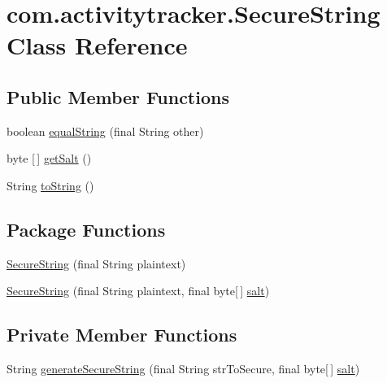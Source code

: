 \hypertarget{classcom_1_1activitytracker_1_1_secure_string}{}\section{com.\+activitytracker.\+Secure\+String Class Reference}
\label{classcom_1_1activitytracker_1_1_secure_string}
\subsection*{Public Member Functions}
\begin{DoxyCompactItemize}
\item 
boolean \mbox{\hyperlink{classcom_1_1activitytracker_1_1_secure_string_a8b5c3cac74b22ff0eb3c43a7ebd980f5}{equal\+String}} (final String other)
\item 
byte \mbox{[}$\,$\mbox{]} \mbox{\hyperlink{classcom_1_1activitytracker_1_1_secure_string_ab5369653852da122aba874f35cbda9a5}{get\+Salt}} ()
\item 
String \mbox{\hyperlink{classcom_1_1activitytracker_1_1_secure_string_aef531e12618c5c147adc52fda0d4add8}{to\+String}} ()
\end{DoxyCompactItemize}
\subsection*{Package Functions}
\begin{DoxyCompactItemize}
\item 
\mbox{\hyperlink{classcom_1_1activitytracker_1_1_secure_string_a889fcbf0c1f771962ac81886f49e389e}{Secure\+String}} (final String plaintext)
\item 
\mbox{\hyperlink{classcom_1_1activitytracker_1_1_secure_string_a04c2f0677ecd9af147428976a11c85e2}{Secure\+String}} (final String plaintext, final byte\mbox{[}$\,$\mbox{]} \mbox{\hyperlink{classcom_1_1activitytracker_1_1_secure_string_a8549ead1f186ff0c2520818b03d1cc21}{salt}})
\end{DoxyCompactItemize}
\subsection*{Private Member Functions}
\begin{DoxyCompactItemize}
\item 
String \mbox{\hyperlink{classcom_1_1activitytracker_1_1_secure_string_aa2521591ab15fb4c5a2461c04b08320f}{generate\+Secure\+String}} (final String str\+To\+Secure, final byte\mbox{[}$\,$\mbox{]} \mbox{\hyperlink{classcom_1_1activitytracker_1_1_secure_string_a8549ead1f186ff0c2520818b03d1cc21}{salt}})
\end{DoxyCompactItemize}
